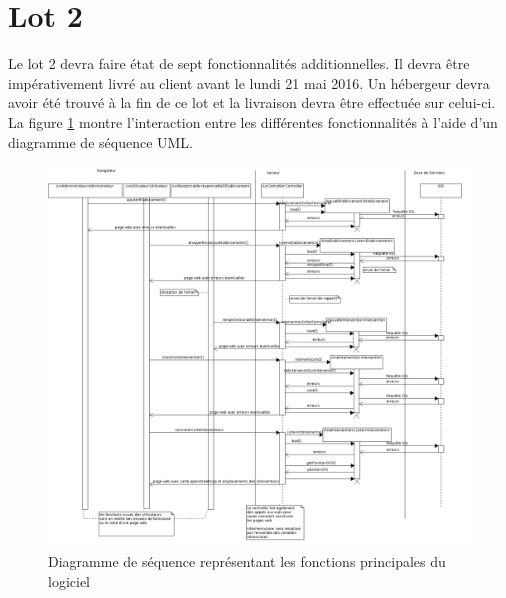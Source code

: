 \section{Lot 2}
	Le lot 2 devra faire état de sept fonctionnalités additionnelles. Il devra être impérativement livré au client avant le lundi 21 mai 2016. Un hébergeur devra avoir été trouvé à la fin de ce lot et la livraison devra être effectuée sur celui-ci.\\
	
	La figure \ref{fonctPrinc} montre l’interaction entre les différentes fonctionnalités à l'aide d'un diagramme de séquence UML.

\begin{figure}[H]
	\begin{center}
	\includegraphics[scale=0.3]{images/fonctionsPrincipales.png}
	\caption{\label{fonctPrinc} Diagramme de séquence représentant les fonctions principales du logiciel}
	\end{center}
\end{figure}
















 



